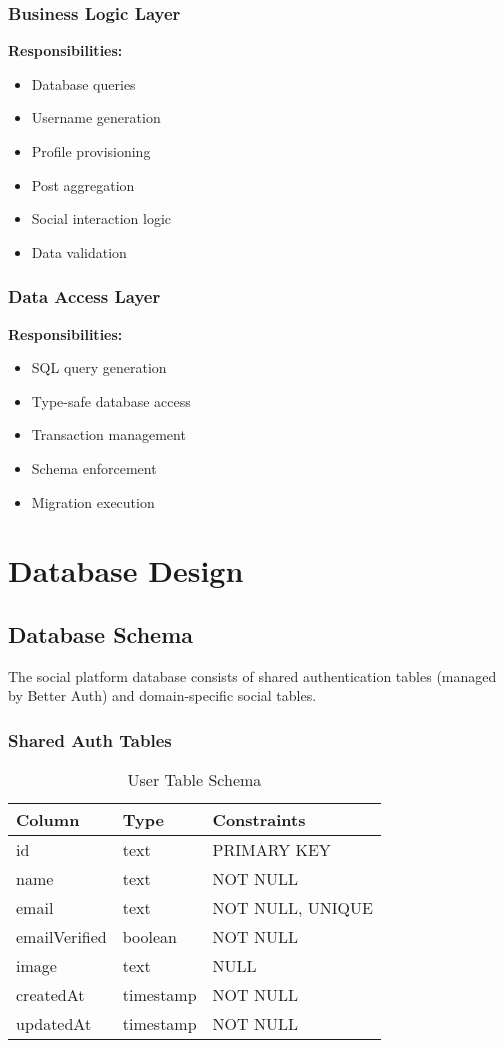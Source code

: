 \documentclass[12pt,a4paper]{report}
\begin{document}
\subsection{Business Logic Layer}

\textbf{Responsibilities:}
\begin{itemize}
    \item Database queries
    \item Username generation
    \item Profile provisioning
    \item Post aggregation
    \item Social interaction logic
    \item Data validation
\end{itemize}

\subsection{Data Access Layer}

\textbf{Responsibilities:}
\begin{itemize}
    \item SQL query generation
    \item Type-safe database access
    \item Transaction management
    \item Schema enforcement
    \item Migration execution
\end{itemize}

\chapter{Database Design}

\section{Database Schema}

The social platform database consists of shared authentication tables (managed by Better Auth) and domain-specific social tables.

\subsection{Shared Auth Tables}

\begin{table}[H]
\centering
\caption{User Table Schema}
\begin{tabular}{@{}lll@{}}
\toprule
\textbf{Column} & \textbf{Type} & \textbf{Constraints} \\ \midrule
id & text & PRIMARY KEY \\
name & text & NOT NULL \\
email & text & NOT NULL, UNIQUE \\
emailVerified & boolean & NOT NULL \\
image & text & NULL \\
createdAt & timestamp & NOT NULL \\
updatedAt & timestamp & NOT NULL \\ \bottomrule
\end{tabular}
\end{table}
\end{document}
